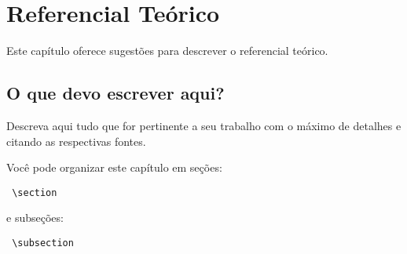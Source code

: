 \chapter{Referencial Teórico}
\label{Referencial_Teorico}


Este capítulo oferece sugestões para descrever o referencial teórico.

\section{O que devo escrever aqui?}%

Descreva aqui tudo que for pertinente a seu trabalho com o máximo de detalhes e citando as respectivas fontes.

Você pode organizar este capítulo em seções:

\begin{verbatim} \section \end{verbatim}

e subseções: 

\begin{verbatim} \subsection \end{verbatim}